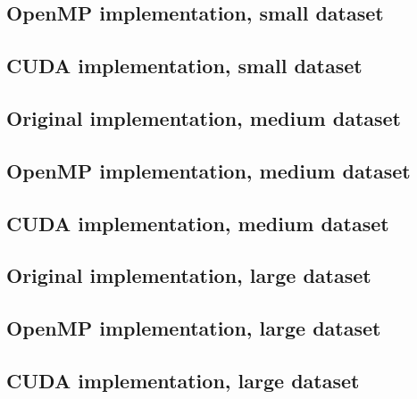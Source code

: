 \documentclass[11pt]{article}
\begin{document}
\subsection{OpenMP implementation, small dataset}

\subsection{CUDA implementation, small dataset}


\subsection{Original implementation, medium dataset}

\subsection{OpenMP implementation, medium dataset}

\subsection{CUDA implementation, medium dataset}


\subsection{Original implementation, large dataset}

\subsection{OpenMP implementation, large dataset}

\subsection{CUDA implementation, large dataset}

\end{document}
